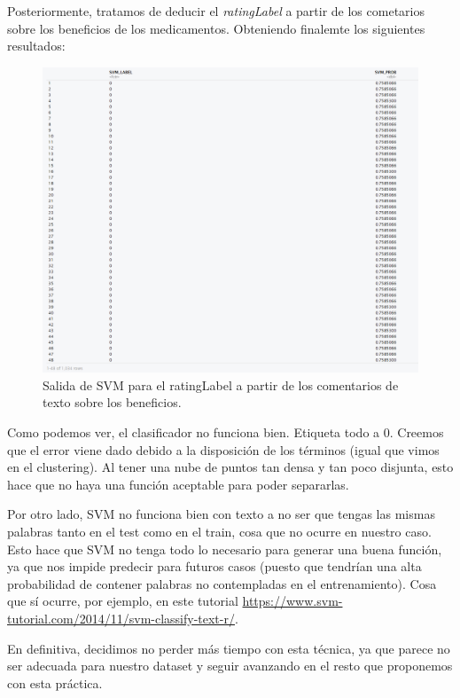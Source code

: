 \documentclass[spanish,]{article}
\begin{document}
Posteriormente, tratamos de deducir el \emph{ratingLabel} a partir de
los cometarios sobre los beneficios de los medicamentos. Obteniendo
finalemte los siguientes resultados:

\begin{figure}[h]
    \centering
    \includegraphics[width=1\textwidth]{figuras/svm/resultado.png}
    \caption{Salida de SVM para el ratingLabel a partir de los comentarios de texto sobre los beneficios.}
    \label{fig:svm:resultados}
\end{figure}

Como podemos ver, el clasificador no funciona bien. Etiqueta todo a 0.
Creemos que el error viene dado debido a la disposición de los términos
(igual que vimos en el clustering). Al tener una nube de puntos tan
densa y tan poco disjunta, esto hace que no haya una función aceptable
para poder separarlas.

Por otro lado, SVM no funciona bien con texto a no ser que tengas las
mismas palabras tanto en el test como en el train, cosa que no ocurre en
nuestro caso. Esto hace que SVM no tenga todo lo necesario para generar
una buena función, ya que nos impide predecir para futuros casos (puesto
que tendrían una alta probabilidad de contener palabras no contempladas
en el entrenamiento). Cosa que sí ocurre, por ejemplo, en este tutorial
\url{https://www.svm-tutorial.com/2014/11/svm-classify-text-r/}.

En definitiva, decidimos no perder más tiempo con esta técnica, ya que
parece no ser adecuada para nuestro dataset y seguir avanzando en el
resto que proponemos con esta práctica.
\end{document}
